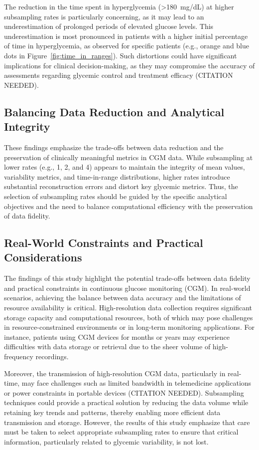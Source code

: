 The reduction in the time spent in hyperglycemia (\textgreater 180~mg/dL) at higher subsampling rates is particularly concerning, as it may lead to an underestimation of prolonged periods of elevated glucose levels. This underestimation is most pronounced in patients with a higher initial percentage of time in hyperglycemia, as observed for specific patients (e.g., orange and blue dots in Figure~\ref{fig:time_in_ranges}). Such distortions could have significant implications for clinical decision-making, as they may compromise the accuracy of assessments regarding glycemic control and treatment efficacy (CITATION NEEDED).

\subsection{Balancing Data Reduction and Analytical Integrity}
These findings emphasize the trade-offs between data reduction and the preservation of clinically meaningful metrics in CGM data. While subsampling at lower rates (e.g., 1, 2, and 4) appears to maintain the integrity of mean values, variability metrics, and time-in-range distributions, higher rates introduce substantial reconstruction errors and distort key glycemic metrics. Thus, the selection of subsampling rates should be guided by the specific analytical objectives and the need to balance computational efficiency with the preservation of data fidelity.

\subsection{Real-World Constraints and Practical Considerations}
The findings of this study highlight the potential trade-offs between data fidelity and practical constraints in continuous glucose monitoring (CGM). In real-world scenarios, achieving the balance between data accuracy and the limitations of resource availability is critical. High-resolution data collection requires significant storage capacity and computational resources, both of which may pose challenges in resource-constrained environments or in long-term monitoring applications. For instance, patients using CGM devices for months or years may experience difficulties with data storage or retrieval due to the sheer volume of high-frequency recordings.

Moreover, the transmission of high-resolution CGM data, particularly in real-time, may face challenges such as limited bandwidth in telemedicine applications or power constraints in portable devices (CITATION NEEDED). Subsampling techniques could provide a practical solution by reducing the data volume while retaining key trends and patterns, thereby enabling more efficient data transmission and storage. However, the results of this study emphasize that care must be taken to select appropriate subsampling rates to ensure that critical information, particularly related to glycemic variability, is not lost.

